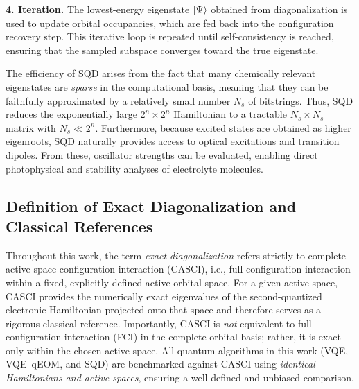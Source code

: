 \documentclass[num-refs]{wiley-article}
\begin{document}
\textbf{4. Iteration.}  
The lowest-energy eigenstate $\ket{\Psi}$ obtained from diagonalization is used to update orbital occupancies, which are fed back into the configuration recovery step. This iterative loop is repeated until self-consistency is reached, ensuring that the sampled subspace converges toward the true eigenstate.

The efficiency of SQD arises from the fact that many chemically relevant eigenstates are \emph{sparse} in the computational basis, meaning that they can be faithfully approximated by a relatively small number $N_s$ of bitstrings. Thus, SQD reduces the exponentially large $2^n \times 2^n$ Hamiltonian to a tractable $N_s \times N_s$ matrix with $N_s \ll 2^n$. Furthermore, because excited states are obtained as higher eigenroots, SQD naturally provides access to optical excitations and transition dipoles. From these, oscillator strengths can be evaluated, enabling direct photophysical and stability analyses of electrolyte molecules.

\subsection{Definition of Exact Diagonalization and Classical References}

Throughout this work, the term \emph{exact diagonalization} refers strictly to 
complete active space configuration interaction (CASCI), i.e., full configuration 
interaction within a fixed, explicitly defined active orbital space. For a given active space, CASCI provides the numerically exact eigenvalues of the 
second-quantized electronic Hamiltonian projected onto that space and therefore 
serves as a rigorous classical reference. Importantly, CASCI is \emph{not} equivalent to full configuration interaction (FCI) in the complete orbital basis; rather, it is exact only within the chosen active space. All quantum algorithms in this work (VQE, VQE–qEOM, and SQD) are benchmarked against CASCI using \emph{identical Hamiltonians and active spaces}, ensuring a well-defined and unbiased comparison.



\end{document}
